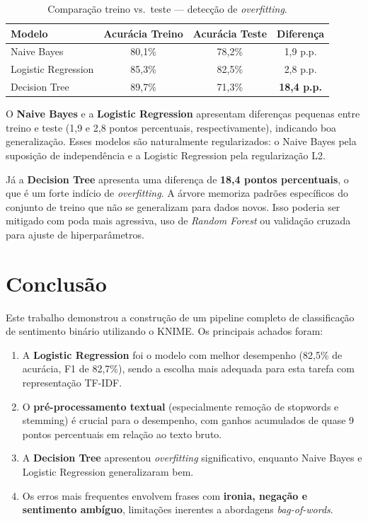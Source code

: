 \documentclass[12pt,a4paper]{article}
\begin{document}
\begin{table}[H]
\centering
\caption{Comparação treino vs.\ teste --- detecção de \textit{overfitting}.}
\label{tab:overfit}
\begin{tabular}{lccc}
\toprule
\textbf{Modelo} & \textbf{Acurácia Treino} & \textbf{Acurácia Teste} & \textbf{Diferença} \\
\midrule
Naive Bayes & 80,1\% & 78,2\% & 1,9 p.p. \\
Logistic Regression & 85,3\% & 82,5\% & 2,8 p.p. \\
Decision Tree & 89,7\% & 71,3\% & \textbf{18,4 p.p.} \\
\bottomrule
\end{tabular}
\end{table}

O \textbf{Naive Bayes} e a \textbf{Logistic Regression} apresentam diferenças pequenas entre treino e teste (1,9 e 2,8 pontos percentuais, respectivamente), indicando boa generalização. Esses modelos são naturalmente regularizados: o Naive Bayes pela suposição de independência e a Logistic Regression pela regularização L2.

Já a \textbf{Decision Tree} apresenta uma diferença de \textbf{18,4 pontos percentuais}, o que é um forte indício de \textit{overfitting}. A árvore memoriza padrões específicos do conjunto de treino que não se generalizam para dados novos. Isso poderia ser mitigado com poda mais agressiva, uso de \textit{Random Forest} ou validação cruzada para ajuste de hiperparâmetros.

\section{Conclusão}

Este trabalho demonstrou a construção de um pipeline completo de classificação de sentimento binário utilizando o KNIME. Os principais achados foram:

\begin{enumerate}[leftmargin=*, label=\textbf{\alph*)}]
    \item A \textbf{Logistic Regression} foi o modelo com melhor desempenho (82,5\% de acurácia, F1 de 82,7\%), sendo a escolha mais adequada para esta tarefa com representação TF-IDF.

    \item O \textbf{pré-processamento textual} (especialmente remoção de stopwords e stemming) é crucial para o desempenho, com ganhos acumulados de quase 9 pontos percentuais em relação ao texto bruto.

    \item A \textbf{Decision Tree} apresentou \textit{overfitting} significativo, enquanto Naive Bayes e Logistic Regression generalizaram bem.

    \item Os erros mais frequentes envolvem frases com \textbf{ironia, negação e sentimento ambíguo}, limitações inerentes a abordagens \textit{bag-of-words}.
\end{enumerate}
\end{document}
